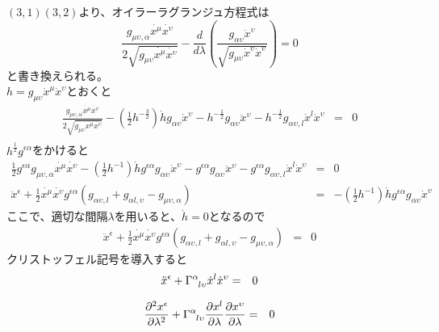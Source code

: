 \documentclass[dvipdfmx]{report} %
\begin{document}
$(3,1)$$(3,2)$より、オイラーラグランジュ方程式は
$$
 \frac{ g_{\mu \upsilon , \alpha} \dot{x^\mu} \dot{x^\upsilon} }{ 2\sqrt{ g_{\mu \upsilon} \dot{x^\mu} \dot{x^\upsilon} } } - \frac{d}{d\lambda} \left( \frac{ g_{\alpha \upsilon}\dot{x}^{\upsilon} }{ \sqrt{g_{\mu \upsilon}\dot{x}^{\upsilon}  \dot{x}^{\upsilon} } } \right) = 0
$$
と書き換えられる。\\
$h = g_{\mu \upsilon}\dot{x}^{\mu}  \dot{x}^{\upsilon}$とおくと
\begin{eqnarray*}
 \frac{ g_{\mu \upsilon , \alpha} \dot{x^\mu} \dot{x^\upsilon} }{ 2\sqrt{ g_{\mu \upsilon} \dot{x^\mu} \dot{x^\upsilon} } } - \left( \frac{1}{2} h^{- \frac{3}{2}} \right) \dot{h} g_{\alpha \upsilon} \dot{x}^{\upsilon} - h^{- \frac{1}{2}} g_{\alpha \upsilon} \ddot{x}^{\upsilon} - h^{- \frac{1}{2}} g_{\alpha \upsilon, l} \dot{x}^l \dot{x}^{\upsilon} &=& 0 \nonumber \\
\end{eqnarray*}
$h^{\frac{1}{2}}g^{\epsilon \alpha}$をかけると
\begin{eqnarray*}
 \frac{1}{2} g^{\epsilon \alpha} g_{\mu \upsilon , \alpha} \dot{x^\mu} \dot{x^\upsilon} - 
\left( \frac{1}{2} h^{-1} \right) \dot{h} g^{\epsilon \alpha} g_{\alpha \upsilon} \dot{x}^{\upsilon} - g^{\epsilon \alpha} g_{\alpha \upsilon} \ddot{x}^{\upsilon} - g^{\epsilon \alpha} g_{\alpha \upsilon, l} \dot{x}^l \dot{x}^{\upsilon} &=& 0 \nonumber \\
\ddot{x}^{\epsilon} + \frac{1}{2} \dot{x^\mu} \dot{x^\upsilon} g^{\epsilon \alpha} \left( g_{\alpha \upsilon, l} + g_{\alpha l, \upsilon} - g_{\mu \upsilon , \alpha} \right) &=&
- \left( \frac{1}{2} h^{-1} \right) \dot{h} g^{\epsilon \alpha} g_{\alpha \upsilon} \dot{x}^{\upsilon}
\end{eqnarray*}
ここで、適切な間隔$\lambda$を用いると、$\dot{h} = 0$となるので
\begin{eqnarray*}
\ddot{x}^{\epsilon} + \frac{1}{2} \dot{x^\mu} \dot{x^\upsilon} g^{\epsilon \alpha} \left( g_{\alpha \upsilon, l} + g_{\alpha l, \upsilon} - g_{\mu \upsilon , \alpha} \right) &=& 0
\end{eqnarray*}
クリストッフェル記号を導入すると
\begin{eqnarray*}
\ddot{x}^{\epsilon} + \tensor{\Gamma}{^{\alpha}_{l \upsilon}} \dot{x}^l \dot{x}^{\upsilon} &=& 0
\end{eqnarray*}
\begin{tcolorbox}[title=測地線方程式]
\begin{eqnarray*}
\frac{ \partial ^2 {x}^{\epsilon} }{ \partial \lambda^2 } + \tensor{\Gamma}{^{\alpha}_{l \upsilon}} \frac{ \partial x^l }{ \partial \lambda } \frac{ \partial x^{\upsilon} }{ \partial \lambda } &=& 0
\end{eqnarray*}
\end{tcolorbox}
\end{document}
